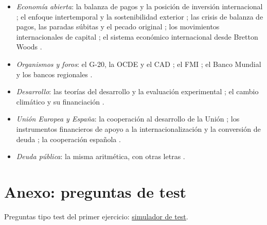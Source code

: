 \documentclass[11pt]{article}
\begin{document}
\begin{itemize}
\item \emph{Economía abierta}: la balanza de pagos y la posición de inversión internacional ; el enfoque intertemporal y la sostenibilidad exterior ; las crisis de balanza de pagos, las paradas súbitas y el pecado original ; los movimientos internacionales de capital ; el sistema económico internacional desde Bretton Woods .
\item \emph{Organismos y foros}: el G-20, la OCDE y el CAD ; el FMI ; el Banco Mundial y los bancos regionales .
\item \emph{Desarrollo}: las teorías del desarrollo y la evaluación experimental ; el cambio climático y su financiación .
\item \emph{Unión Europea y España}: la cooperación al desarrollo de la Unión ; los instrumentos financieros de apoyo a la internacionalización y la conversión de deuda ; la cooperación española .
\item \emph{Deuda pública}: la misma aritmética, con otras letras .
\end{itemize}

\section{Anexo: preguntas de test}\label{anexo:test}

\begin{anotaciones}
Preguntas tipo test del primer ejercicio: \href{https://www.victorgutierrezmarcos.es/oposicion/temario/primer-ejercicio/test/simulador.html?tema=3.B.29}{simulador de test}.
\end{anotaciones}

\bibliografia
\end{document}
